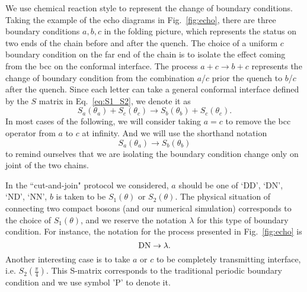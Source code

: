 
We use chemical reaction style to represent the change of boundary conditions. Taking the example of the echo diagrams in Fig.~\ref{fig:echo}, there are three boundary conditions $a,b,c$ in the folding picture, which represents the status on two ends of the chain before and after the quench. The choice of a uniform $c$ boundary condition on the far end of the chain is to isolate the effect coming from the bcc on the conformal interface. The process $a + c \rightarrow b + c$ represents the change of boundary condition from the combination $a$/$c$ prior the quench to $b$/$c$ after the quench. Since each letter can take a general conformal interface defined by the $S$ matrix in Eq.~\eqref{eq:S1_S2}, we denote it as
\begin{equation}
\label{eq:Full_notation_rand()}
S_a( \theta_a ) + S_c( \theta_c) \rightarrow S_b( \theta_b )  + S_c( \theta_c ) .
\end{equation}
In most cases of the following, we will consider taking $a = c$ to remove the bcc operator from $a$ to $c$ at infinity. And we will use the shorthand notation
\begin{equation}
S_a( \theta_a ) \rightarrow S_b( \theta_b )
\end{equation}
to remind ourselves that we are isolating the boundary condition change only on joint of the two chains. 

In the ``cut-and-join" protocol we considered, $a$ should be one of `DD', `DN', `ND', `NN', $b$ is taken to be $S_1( \theta )$ or $S_2( \theta )$. The physical situation of connecting two compact bosons (and our numerical simulation) corresponds to the choice of $S_1( \theta)$, and we reserve the notation $\lambda$ for this type of boundary condition. For instance, the notation for the process presented in Fig.~\ref{fig:echo} is
\begin{equation}
\label{eq:DNDN}
 {\rm DN} \rightarrow \lambda.
\end{equation}
Another interesting case is to take $a$ or $c$ to be completely transmitting interface, i.e. $S_2( \frac{\pi}{4} )$. This S-matrix corresponds to the traditional periodic boundary condition and we use symbol 'P' to denote it. 


